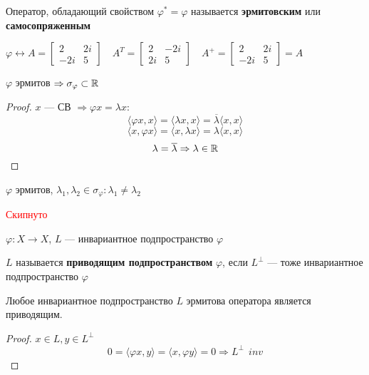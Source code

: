 \begin{definition}
    Оператор, обладающий свойством $\varphi^*=\varphi$ называется \textbf{эрмитовским} или \textbf{самосопряженным}
\end{definition}

\begin{example}
    $\varphi\leftrightarrow A = \begin{bmatrix}
        2 & 2i \\
        -2i & 5
    \end{bmatrix} \quad A^T = \begin{bmatrix}
        2 & -2i \\
        2i & 5
    \end{bmatrix} \quad A^+ = \begin{bmatrix}
        2 & 2i \\
        -2i & 5
    \end{bmatrix} = A$
\end{example}

\begin{lemma}
    $\varphi$ эрмитов $\Rightarrow \sigma_\varphi\subset\mathbb{R}$
\end{lemma}
\begin{proof}
    $x$ --- СВ $\Rightarrow \varphi x = \lambda x$:
    $$\langle \varphi x, x \rangle = \langle \lambda x, x \rangle = \overline \lambda \langle x, x \rangle$$
    $$\langle x, \varphi x \rangle = \langle x, \lambda x \rangle = \lambda \langle x, x \rangle$$
    $$\lambda = \overline \lambda \Rightarrow \lambda\in\mathbb{R}$$
\end{proof}

\begin{lemma}
    $\varphi$ эрмитов, $\lambda_1, \lambda_2\in\sigma_\varphi : \lambda_1 \not= \lambda_2$

    \textcolor{red}{Скипнуто}
\end{lemma}

\begin{definition}
    $\varphi : X \to X$, $L$ --- инвариантное подпространство $\varphi$

    $L$ называется \textbf{приводящим подпространством} $\varphi$, если $L^\perp$ --- тоже инвариантное подпространство $\varphi$
\end{definition}

\begin{lemma}
    Любое инвариантное подпространство $L$ эрмитова оператора является приводящим.
\end{lemma}
\begin{proof}
    $x\in L, y\in L^\perp$
    $$0 = \langle \varphi x, y \rangle = \langle x, \varphi y \rangle = 0 \Rightarrow L^\perp\ \ inv$$
\end{proof}

